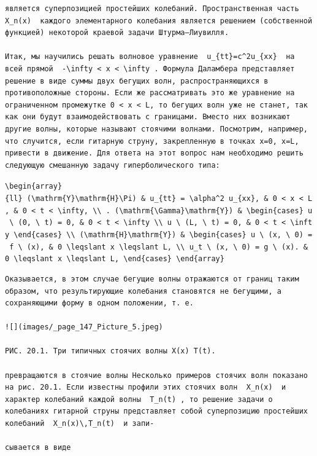 \documentclass[
  ukrainian,
]{article}
\begin{document}
\begin{verbatim}
является суперпозицией простейших колебаний. Пространственная часть  X_n(x)  каждого элементарного колебания является решением (собственной функцией) некоторой краевой задачи Штурма—Лиувилля.

Итак, мы научились решать волновое уравнение  u_{tt}=c^2u_{xx}  на всей прямой  -\infty < x < \infty . Формула Даламбера представляет решение в виде суммы двух бегущих волн, распространяющихся в противоположные стороны. Если же рассматривать это же уравнение на ограниченном промежутке 0 < x < L, то бегущих волн уже не станет, так как они будут взаимодействовать с границами. Вместо них возникают другие волны, которые называют стоячими волнами. Посмотрим, например, что случится, если гитарную струну, закрепленную в точках x=0, x=L, привести в движение. Для ответа на этот вопрос нам необходимо решить следующую смешанную задачу гиперболического типа:
\end{verbatim}

\texttt{\textbackslash{}begin\{array\}\{ll\}\ (\textbackslash{}mathrm\{Y\}\textbackslash{}mathrm\{H\}\textbackslash{}Pi)\ \&\ u\_\{tt\}\ =\ \textbackslash{}alpha\^{}2\ u\_\{xx\},\ \&\ 0\ \textless{}\ x\ \textless{}\ L,\ \&\ 0\ \textless{}\ t\ \textless{}\ \textbackslash{}infty,\ \textbackslash{}\textbackslash{}\ .\ (\textbackslash{}mathrm\{\textbackslash{}Gamma\}\textbackslash{}mathrm\{Y\})\ \&\ \textbackslash{}begin\{cases\}\ u\ \textbackslash{}\ (0,\ \textbackslash{}\ t)\ =\ 0,\ \&\ 0\ \textless{}\ t\ \textless{}\ \textbackslash{}infty\ \textbackslash{}\textbackslash{}\ u\ \textbackslash{}\ (L,\ \textbackslash{}\ t)\ =\ 0,\ \&\ 0\ \textless{}\ t\ \textless{}\ \textbackslash{}infty\ \textbackslash{}end\{cases\}\ \textbackslash{}\textbackslash{}\ (\textbackslash{}mathrm\{H\}\textbackslash{}mathrm\{Y\})\ \&\ \textbackslash{}begin\{cases\}\ u\ \textbackslash{}\ (x,\ \textbackslash{}\ 0)\ =\ f\ \textbackslash{}\ (x),\ \&\ 0\ \textbackslash{}leqslant\ x\ \textbackslash{}leqslant\ L,\ \textbackslash{}\textbackslash{}\ u\_t\ \textbackslash{}\ (x,\ \textbackslash{}\ 0)\ =\ g\ \textbackslash{}\ (x).\ \&\ 0\ \textbackslash{}leqslant\ x\ \textbackslash{}leqslant\ L,\ \textbackslash{}end\{cases\}\ \textbackslash{}end\{array\}}

\begin{verbatim}
Оказывается, в этом случае бегущие волны отражаются от границ таким образом, что результирующие колебания становятся не бегущими, а сохраняющими форму в одном положении, т. е.

![](images/_page_147_Picture_5.jpeg)

РИС. 20.1. Три типичных стоячих волны X(x) T(t).

превращаются в стоячие волны Несколько примеров стоячих волн показано на рис. 20.1. Если известны профили этих стоячих волн  X_n(x)  и характер колебаний каждой волны  T_n(t) , то решение задачи о колебаниях гитарной струны представляет собой суперпозицию простейших колебаний  X_n(x)\,T_n(t)  и запи-

сывается в виде
\end{verbatim}
\end{document}
